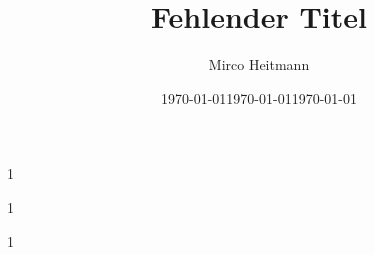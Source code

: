 \providecommand{\fontAtkinson}{0}
\providecommand{\fontFira}{0}
\providecommand{\fontRaleway}{0}

\usepackage{babel}
\usepackage[utf8]{inputenc}
\usepackage{amsmath}
\usepackage{tabularray}
\usepackage{xcolor}
\usepackage{multirow}
\usepackage{graphicx}
\usepackage{xurl}
\usepackage{standalone}
\usepackage[useregional]{datetime2}
\usepackage{letltxmacro}
\usepackage[T1]{fontenc}

\if\fontAtkinson1
  \usepackage{arev}
  \usepackage[sfdefault]{atkinson}
\else
  \if\fontFira1
    \usepackage{arev}
    \usepackage[sfdefault,lining]{FiraSans}
    \usepackage[lining]{FiraMono}
  \else
    \if\fontRaleway1
      \usepackage{arev}
      \usepackage[default]{raleway}
    \else
      \usepackage{lmodern}
    \fi
  \fi
\fi

\graphicspath{ {./img/} }

\newcommand{\setTitle}[1]{
\hypersetup{pdftitle=#1}
\title{#1}
}

\newcommand{\setAuthor}[1]{
\hypersetup{pdfauthor=#1}
\author{#1}
}

\newcommand{\setInstitute}[1]{
\institute{#1}
}

\newcommand{\setDate}[1]{
\date{\ifx#1\today\today\else\DTMdate{#1}\fi}
}

\setTitle{Fehlender Titel}
\setAuthor{Mirco Heitmann}
\setInstitute{THM}
\setDate{\today}

\newcommand{\smallsource}[1]{{\fontsize{6pt}{6pt}\fontshape{n}\fontseries{m}\selectfont \textit{Quelle: \href{#1}{#1}}}}
\newcommand{\smallersource}[1]{{\fontsize{6pt}{6pt}\fontshape{n}\fontseries{m}\selectfont \href{#1}{#1}}}
\providecommand{\framesourcesname}{Quellen}
\newcommand{\framesources}[1]{
\section{\framesourcesname}
\begin{frame}
\frametitle{\framesourcesname}
\begin{itemize}
#1
\end{itemize}
\end{frame}
}
\newcommand{\todo}[1]{{\color{red}#1}}
\newcommand{\graphicsfig}[4]{
\begin{figure}[H]
\centering
\texttt{[image: \#1]}
\caption{#2} \label{#3}
\end{figure}
}


